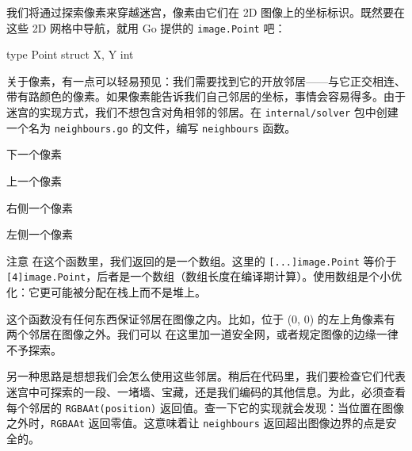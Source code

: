 我们将通过探索像素来穿越迷宫，像素由它们在 2D 图像上的坐标标识。既然要在这些 2D 网格中导航，就用 Go 提供的 \texttt{image.Point} 吧：

\begin{gocode}[]
type Point struct {
    X, Y int
}
\end{gocode}

关于像素，有一点可以轻易预见：我们需要找到它的开放邻居——与它正交相连、带有路颜色的像素。如果像素能告诉我们自己邻居的坐标，事情会容易得多。由于迷宫的实现方式，我们不想包含对角相邻的邻居。在 \texttt{internal/solver} 包中创建一个名为 \texttt{neighbours.go} 的文件，编写 \texttt{neighbours} 函数。


\begin{codeannotations}
\item 下一个像素
\item 上一个像素
\item 右侧一个像素
\item 左侧一个像素
\end{codeannotations}

\begin{infobox}{注意}
在这个函数里，我们返回的是一个数组。这里的 \texttt{[...]image.Point} 等价于 \texttt{[4]image.Point}，后者是一个数组（数组长度在编译期计算）。使用数组是个小优化：它更可能被分配在栈上而不是堆上。
\end{infobox}

这个函数没有任何东西保证邻居在图像之内。比如，位于 (0, 0) 的左上角像素有两个邻居在图像之外。我们可以
在这里加一道安全网，或者规定图像的边缘一律不予探索。

另一种思路是想想我们会怎么使用这些邻居。稍后在代码里，我们要检查它们代表迷宫中可探索的一段、一堵墙、宝藏，还是我们编码的其他信息。为此，必须查看每个邻居的 \texttt{RGBAAt(position)} 返回值。查一下它的实现就会发现：当位置在图像之外时，\texttt{RGBAAt} 返回零值。这意味着让 \texttt{neighbours} 返回超出图像边界的点是安全的。

